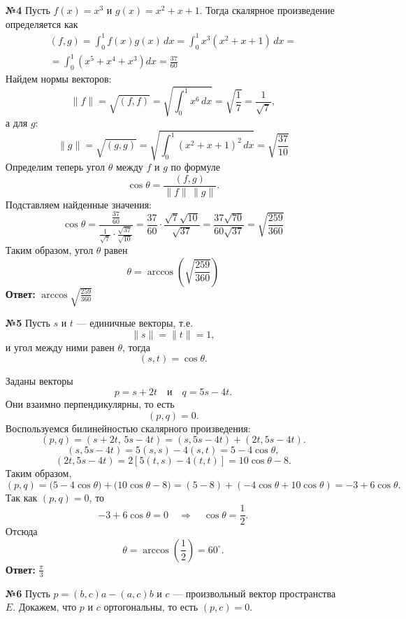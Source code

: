 \documentclass[a4paper]{article}
\renewcommand{\f}[2]{\frac{#1}{#2}}
\begin{document}
\begin{enumerate}
    \item[\textbf{№4}]
    Пусть \( f(x) = x^3 \) и \( g(x) = x^2 + x + 1 \). Тогда скалярное произведение определяется как
    \[
    \begin{aligned}
        (f, g) = \int_0^1 f(x) g(x) \, dx = \int_0^1 x^3 (x^2+x+1) \, dx =\\
        = \int_0^1 \left( x^5 + x^4 + x^3 \right) dx = \f{37}{60}
    \end{aligned}
    \]
    Найдем нормы векторов:
    \[
    \|f\| = \sqrt{(f, f)} = \sqrt{\int_0^1 x^6 \, dx} = \sqrt{\frac{1}{7}} = \frac{1}{\sqrt{7}},
    \]
    а для \(g\):
    \[
    \|g\| = \sqrt{(g, g)} = \sqrt{\int_0^1 (x^2+x+1)^2 \, dx} = \sqrt{\f{37}{10}}
    \]
    Определим теперь угол \( \theta \) между \( f \) и \( g \) по формуле
    \[
    \cos \theta = \frac{(f, g)}{\|f\|\, \|g\|}.
    \]
    Подставляем найденные значения:
    \[
    \cos \theta = \frac{\frac{37}{60}}{\frac{1}{\sqrt{7}} \cdot \frac{\sqrt{37}}{\sqrt{10}}} = \frac{37}{60} \cdot \frac{\sqrt{7}\sqrt{10}}{\sqrt{37}} = \frac{37\sqrt{70}}{60\sqrt{37}}= \sqrt{\f{259}{360}}
    \]
    Таким образом, угол \( \theta \) равен
    \[
    \theta = \arccos\left(\sqrt{\f{259}{360}}\right)
    \]
    \textbf{Ответ:} $\arccos\sqrt{\f{259}{360}}$\\

    \item[\textbf{№5}]
    Пусть \( s \) и \( t \) --- единичные векторы, т.е.
    \[
    \|s\| = \|t\| = 1,
    \]
    и угол между ними равен \(\theta\), тогда
    \[
    (s, t) = \cos \theta.
    \]
    
    Заданы векторы
    \[
    p = s + 2t \quad \text{и} \quad q = 5s - 4t.
    \]
    Они взаимно перпендикулярны, то есть
    \[
    (p, q) = 0.
    \]
    Воспользуемся билинейностью скалярного произведения:
    \[
    (p, q) = (s + 2t,\, 5s - 4t) = (s, 5s - 4t) + (2t, 5s - 4t).
    \]
    \[
    (s, 5s - 4t) = 5(s,s) - 4(s,t) = 5 - 4\cos \theta,
    \]
    \[
    (2t, 5s - 4t) = 2\left[5(t,s) - 4(t,t)\right] = 10\cos \theta - 8.
    \]
    Таким образом,
    \[
    (p, q) = \bigl(5 - 4\cos \theta\bigr) + \bigl(10\cos \theta - 8\bigr) = (5 - 8) + ( -4\cos \theta + 10\cos \theta ) = -3 + 6\cos \theta.
    \]
    Так как \((p,q) = 0\), то
    \[
    -3 + 6\cos \theta = 0 \quad \Longrightarrow \quad \cos \theta = \frac{1}{2}.
    \]
    Отсюда
    \[
    \theta = \arccos\left(\frac{1}{2}\right) = 60^\circ.
    \]
    \textbf{Ответ: } $\f{\pi}{3}$\\
    
    \item[\textbf{№6}]
    Пусть \( p = (b,c)a - (a,c)b \) и \( c \) --- произвольный вектор пространства \( E \). Докажем, что \( p \) и \( c \) ортогональны, то есть \( (p, c) = 0 \).
    

\end{enumerate}
\end{document}
